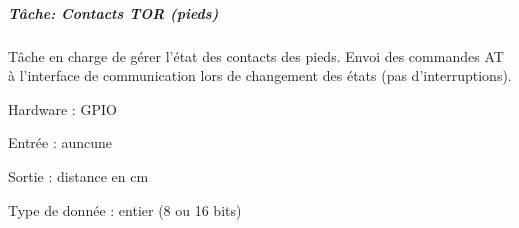 \subparagraph*{Tâche\-: Contacts T\-O\-R (pieds)}

Tâche en charge de gérer l'état des contacts des pieds. Envoi des commandes A\-T à l'interface de communication lors de changement des états (pas d'interruptions).


\begin{DoxyItemize}
\item Hardware \-: G\-P\-I\-O
\item Entrée \-: auncune
\item Sortie \-: distance en cm
\begin{DoxyItemize}
\item Type de donnée \-: entier (8 ou 16 bits) 
\end{DoxyItemize}
\end{DoxyItemize}
